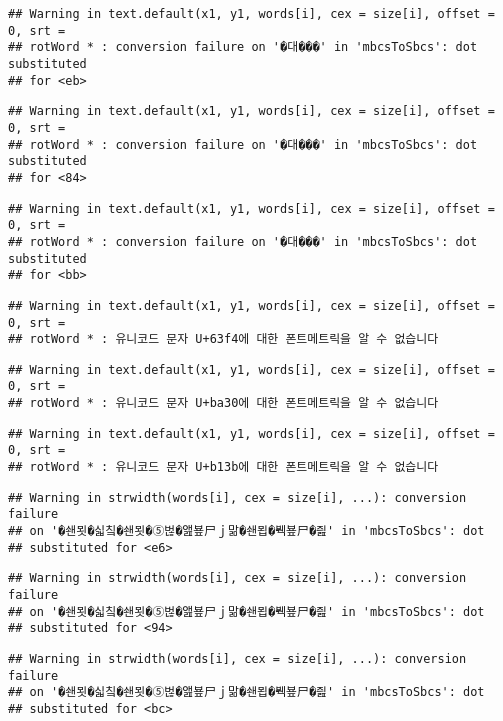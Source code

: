 \documentclass[]{article}
\begin{document}
\begin{verbatim}
## Warning in text.default(x1, y1, words[i], cex = size[i], offset = 0, srt =
## rotWord * : conversion failure on '�대���' in 'mbcsToSbcs': dot substituted
## for <eb>
\end{verbatim}

\begin{verbatim}
## Warning in text.default(x1, y1, words[i], cex = size[i], offset = 0, srt =
## rotWord * : conversion failure on '�대���' in 'mbcsToSbcs': dot substituted
## for <84>
\end{verbatim}

\begin{verbatim}
## Warning in text.default(x1, y1, words[i], cex = size[i], offset = 0, srt =
## rotWord * : conversion failure on '�대���' in 'mbcsToSbcs': dot substituted
## for <bb>
\end{verbatim}

\begin{verbatim}
## Warning in text.default(x1, y1, words[i], cex = size[i], offset = 0, srt =
## rotWord * : 유니코드 문자 U+63f4에 대한 폰트메트릭을 알 수 없습니다
\end{verbatim}

\begin{verbatim}
## Warning in text.default(x1, y1, words[i], cex = size[i], offset = 0, srt =
## rotWord * : 유니코드 문자 U+ba30에 대한 폰트메트릭을 알 수 없습니다
\end{verbatim}

\begin{verbatim}
## Warning in text.default(x1, y1, words[i], cex = size[i], offset = 0, srt =
## rotWord * : 유니코드 문자 U+b13b에 대한 폰트메트릭을 알 수 없습니다
\end{verbatim}

\begin{verbatim}
## Warning in strwidth(words[i], cex = size[i], ...): conversion failure
## on '�쇈묏�싧칰�쇈묏�⑤벊�앮뵾尸ｊ맒�쇈묍�붹뵾尸�즲' in 'mbcsToSbcs': dot
## substituted for <e6>
\end{verbatim}

\begin{verbatim}
## Warning in strwidth(words[i], cex = size[i], ...): conversion failure
## on '�쇈묏�싧칰�쇈묏�⑤벊�앮뵾尸ｊ맒�쇈묍�붹뵾尸�즲' in 'mbcsToSbcs': dot
## substituted for <94>
\end{verbatim}

\begin{verbatim}
## Warning in strwidth(words[i], cex = size[i], ...): conversion failure
## on '�쇈묏�싧칰�쇈묏�⑤벊�앮뵾尸ｊ맒�쇈묍�붹뵾尸�즲' in 'mbcsToSbcs': dot
## substituted for <bc>
\end{verbatim}
\end{document}
